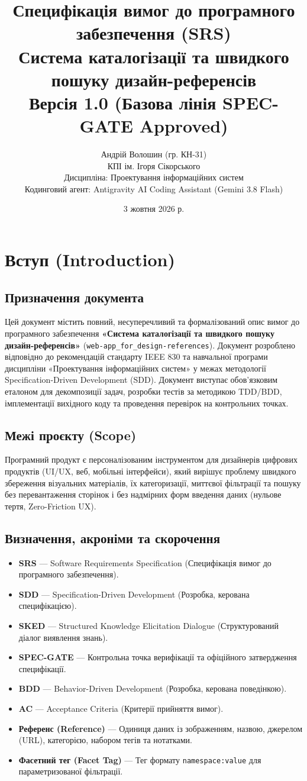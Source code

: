 \documentclass[12pt,a4paper]{article}
\title{\textbf{Специфікація вимог до програмного забезпечення (SRS)}\\
\large Система каталогізації та швидкого пошуку дизайн-референсів\\
\normalsize Версія 1.0 (Базова лінія SPEC-GATE Approved)}
\author{Андрій Волошин (гр. КН-31)\\
КПІ ім. Ігоря Сікорського\\
Дисципліна: Проектування інформаційних систем\\
Кодинговий агент: Antigravity AI Coding Assistant (Gemini 3.8 Flash)}
\date{3 жовтня 2026 р.}
\begin{document}
\maketitle
\tableofcontents
\newpage

\section{Вступ (Introduction)}

\subsection{Призначення документа}
Цей документ містить повний, несуперечливий та формалізований опис вимог до програмного забезпечення \textbf{«Система каталогізації та швидкого пошуку дизайн-референсів»} (\texttt{web-app\_for\_design-references}). Документ розроблено відповідно до рекомендацій стандарту IEEE 830 та навчальної програми дисципліни «Проектування інформаційних систем» у межах методології Specification-Driven Development (SDD). Документ виступає обов'язковим еталоном для декомпозиції задач, розробки тестів за методикою TDD/BDD, імплементації вихідного коду та проведення перевірок на контрольних точках.

\subsection{Межі проєкту (Scope)}
Програмний продукт є персоналізованим інструментом для дизайнерів цифрових продуктів (UI/UX, веб, мобільні інтерфейси), який вирішує проблему швидкого збереження візуальних матеріалів, їх категоризації, миттєвої фільтрації та пошуку без перевантаження сторінок і без надмірних форм введення даних (нульове тертя, Zero-Friction UX).

\subsection{Визначення, акроніми та скорочення}
\begin{itemize}[noitemsep]
    \item \textbf{SRS} --- Software Requirements Specification (Специфікація вимог до програмного забезпечення).
    \item \textbf{SDD} --- Specification-Driven Development (Розробка, керована специфікацією).
    \item \textbf{SKED} --- Structured Knowledge Elicitation Dialogue (Структурований діалог виявлення знань).
    \item \textbf{SPEC-GATE} --- Контрольна точка верифікації та офіційного затвердження специфікації.
    \item \textbf{BDD} --- Behavior-Driven Development (Розробка, керована поведінкою).
    \item \textbf{AC} --- Acceptance Criteria (Критерії прийняття вимог).
    \item \textbf{Референс (Reference)} --- Одиниця даних із зображенням, назвою, джерелом (URL), категорією, набором тегів та нотатками.
    \item \textbf{Фасетний тег (Facet Tag)} --- Тег формату \texttt{namespace:value} для параметризованої фільтрації.
\end{itemize}
\end{document}
